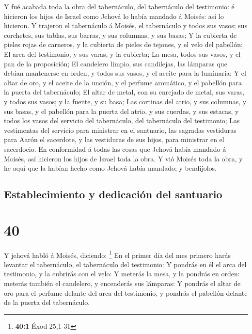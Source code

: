  Y fué acabada toda la obra del tabernáculo, del
tabernáculo del testimonio: é hicieron los hijos de Israel como Jehová
lo había mandado á Moisés: así lo hicieron.  Y trajeron el
tabernáculo á Moisés, el tabernáculo y todos sus vasos; sus corchetes,
sus tablas, sus barras, y sus columnas, y sus basas;  Y la
cubierta de pieles rojas de carneros, y la cubierta de pieles de
tejones, y el velo del pabellón;  El arca del testimonio, y
sus varas, y la cubierta;  La mesa, todos sus vasos, y el
pan de la proposición;  El candelero limpio, sus
candilejas, las lámparas que debían mantenerse en orden, y todos sus
vasos, y el aceite para la luminaria;  Y el altar de oro, y
el aceite de la unción, y el perfume aromático, y el pabellón para la
puerta del tabernáculo;  El altar de metal, con su enrejado
de metal, sus varas, y todos sus vasos; y la fuente, y su basa;
 Las cortinas del atrio, y sus columnas, y sus basas, y el
pabellón para la puerta del atrio, y sus cuerdas, y sus estacas, y todos
los vasos del servicio del tabernáculo, del tabernáculo del testimonio;
 Las vestimentas del servicio para ministrar en el
santuario, las sagradas vestiduras para Aarón el sacerdote, y las
vestiduras de sus hijos, para ministrar en el sacerdocio. 
En conformidad á todas las cosas que Jehová había mandado á Moisés, así
hicieron los hijos de Israel toda la obra.  Y vió Moisés
toda la obra, y he aquí que la habían hecho como Jehová había mandado; y
bendíjolos.

\hypertarget{establecimiento-y-dedicaciuxf3n-del-santuario}{%
\subsection{Establecimiento y dedicación del
santuario}\label{establecimiento-y-dedicaciuxf3n-del-santuario}}

\hypertarget{section-39}{%
\section{40}\label{section-39}}

 Y jehová habló á Moisés, diciendo: \footnote{\textbf{40:1}
  Éxod 25,1-31}  En el primer día del mes primero harás
levantar el tabernáculo, el tabernáculo del testimonio:  Y
pondrás en él el arca del testimonio, y la cubrirás con el velo:
 Y meterás la mesa, y la pondrás en orden: meterás también
el candelero, y encenderás sus lámparas:  Y pondrás el altar
de oro para el perfume delante del arca del testimonio, y pondrás el
pabellón delante de la puerta del tabernáculo.

